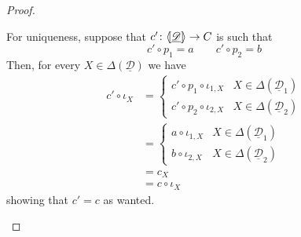 \documentclass[a4paper,UKenglish,cleveref,pdftex, thm-restate,numberwithinsect]{lipics}
\newcommand{\dder}[1]{\mathscr{#1}}
\newcommand{\der}[1]{\underline{\dder{#1}}}
\newcommand{\lpro}{\langle \hspace{-1.85pt}[}
\newcommand{\rpro}{]\hspace{-1.85pt}\rangle}
\newcommand{\tpro}[1]{\lpro \der{#1}\rpro}
\begin{document}
\begin{proof}
\begin{enumerate}
	For uniqueness, suppose that $c'\colon \tpro{D}\to C$ is such that
	\[c'\circ p_1=a \qquad c'\circ p_2 = b\]
Then, for every $X\in \Delta(\der{D})$ we have
\begin{align*}
	c'\circ \iota_X &= \begin{cases}
	c'\circ p_1\circ \iota_{1, X} & X\in \Delta(\der{D}_1)\\
	c'\circ p_2\circ \iota_{2, X} & X\in \Delta(\der{D}_2)
	\end{cases}\\&=\begin{cases}
a\circ \iota_{1, X} & X\in \Delta(\der{D}_1)\\
b\circ \iota_{2, X} & X\in \Delta(\der{D}_2)
	\end{cases}\\&=c_X\\&=c\circ \iota_X
\end{align*}
showing that $c'=c$ as wanted.	 \qedhere 
	\end{enumerate}
\end{proof}
\end{document}
